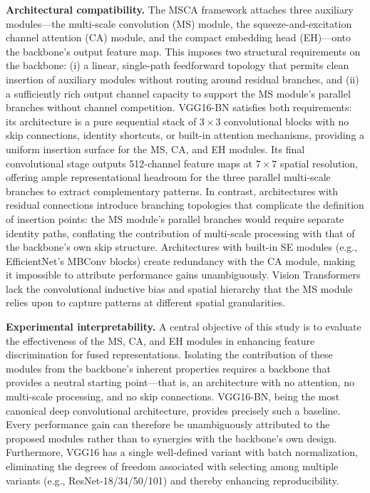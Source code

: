 \documentclass[journal]{IEEEtran}
\begin{document}
\textbf{Architectural compatibility.} The MSCA framework attaches three auxiliary modules—the multi-scale convolution (MS) module, the squeeze-and-excitation channel attention (CA) module, and the compact embedding head (EH)—onto the backbone's output feature map. This imposes two structural requirements on the backbone: (i) a linear, single-path feedforward topology that permits clean insertion of auxiliary modules without routing around residual branches, and (ii) a sufficiently rich output channel capacity to support the MS module's parallel branches without channel competition. VGG16-BN satisfies both requirements: its architecture is a pure sequential stack of $3\times3$ convolutional blocks with no skip connections, identity shortcuts, or built-in attention mechanisms, providing a uniform insertion surface for the MS, CA, and EH modules. Its final convolutional stage outputs 512-channel feature maps at $7\times7$ spatial resolution, offering ample representational headroom for the three parallel multi-scale branches to extract complementary patterns. In contrast, architectures with residual connections introduce branching topologies that complicate the definition of insertion points: the MS module's parallel branches would require separate identity paths, conflating the contribution of multi-scale processing with that of the backbone's own skip structure. Architectures with built-in SE modules (e.g., EfficientNet's MBConv blocks) create redundancy with the CA module, making it impossible to attribute performance gains unambiguously. Vision Transformers lack the convolutional inductive bias and spatial hierarchy that the MS module relies upon to capture patterns at different spatial granularities.

\textbf{Experimental interpretability.} A central objective of this study is to evaluate the effectiveness of the MS, CA, and EH modules in enhancing feature discrimination for fused representations. Isolating the contribution of these modules from the backbone's inherent properties requires a backbone that provides a neutral starting point—that is, an architecture with no attention, no multi-scale processing, and no skip connections. VGG16-BN, being the most canonical deep convolutional architecture, provides precisely such a baseline. Every performance gain can therefore be unambiguously attributed to the proposed modules rather than to synergies with the backbone's own design. Furthermore, VGG16 has a single well-defined variant with batch normalization, eliminating the degrees of freedom associated with selecting among multiple variants (e.g., ResNet-18/34/50/101) and thereby enhancing reproducibility.
\end{document}
